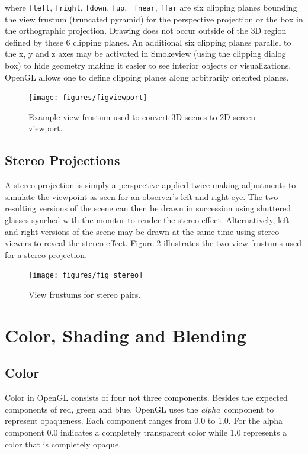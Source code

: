 \documentclass[11pt,twoside]{book}
\begin{document}
\noindent where {\tt fleft}, {\tt fright}, {\tt fdown}, {\tt fup}, {\tt
fnear}, {\tt ffar} are six clipping planes bounding the view
frustum (truncated pyramid) for the perspective projection or the
box in the orthographic projection.  Drawing does not occur
outside of the 3D region defined by these 6 clipping planes. An
additional six clipping planes parallel to the x, y and z axes may
be activated in Smokeview (using the clipping dialog box) to hide
geometry making it easier to see interior objects or
visualizations.  OpenGL allows one to define clipping planes along
arbitrarily oriented planes.
\begin{figure}[t]
\begin{center}
\texttt{[image: figures/figviewport]}
\end{center}
\caption{Example view frustum used to convert 3D scenes to 2D
screen viewport.}
 \label{figfrustum}
\end{figure}

\section{Stereo Projections}

A stereo projection is simply a perspective applied twice making adjustments to simulate the viewpoint as seen for an observer's left and right eye.  The two resulting versions of the 
scene can then be drawn in succession using shuttered glasses synched with the monitor to render the stereo effect.  Alternatively, left and right versions of the scene may be drawn at the same time using stereo viewers to reveal the stereo effect.  Figure \ref{figstereo} illustrates the two view frustums used for a stereo projection.

\begin{figure}[t]
\begin{center}
\texttt{[image: figures/fig\_stereo]}
\end{center}
\caption{View frustums for stereo pairs.}
 \label{figstereo}
\end{figure}





\chapter{Color, Shading and Blending}
\section{Color}
Color
in OpenGL consists of four not three components.  Besides the expected components
of red, green and blue, OpenGL uses the {\em alpha}\ component to represent opaqueness.
Each component ranges from 0.0 to 1.0. For the alpha component
0.0 indicates a completely transparent color while 1.0
represents a color that is completely opaque. 
\end{document}

